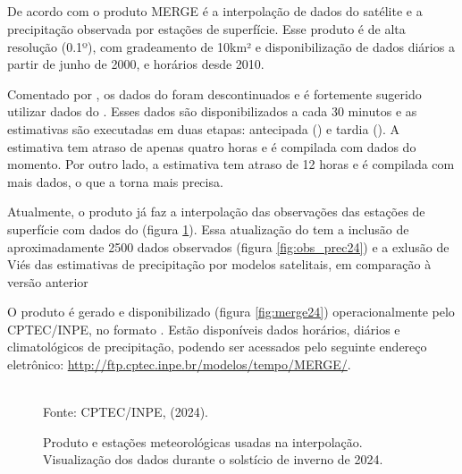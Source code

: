 \subsection{}

\indent De acordo com  o produto \acrshort{MERGE} é a interpolação de dados do satélite  e a precipitação observada por estações de superfície. Esse produto é de alta resolução (0.1º), com gradeamento de 10km² e disponibilização de dados diários a partir de junho de 2000, e horários desde 2010.

\indent Comentado por , os dados do  foram descontinuados e é fortemente sugerido utilizar dados do . Esses dados são disponibilizados a cada 30 minutos e as estimativas são executadas em duas etapas: antecipada () e tardia (). A estimativa  tem atraso de apenas quatro horas e é compilada com dados do momento. Por outro lado, a estimativa  tem atraso de 12 horas e é compilada com mais dados, o que a torna mais precisa.

\indent Atualmente, o produto  já faz a interpolação das observações das estações de superfície com dados do  (figura \ref{fig:merge_obs24}). Essa atualização do  tem a inclusão de aproximadamente 2500 dados observados (figura \ref{fig:obs_prec24}) e a exlusão de Viés das estimativas de precipitação por modelos satelitais, em comparação à versão anterior \cite{MERGEatual}

\indent O produto é gerado e disponibilizado (figura \ref{fig:merge24}) operacionalmente pelo \acrshort{CPTEC}/\acrshort{INPE}, no formato . Estão disponíveis dados horários, diários e climatológicos de precipitação, podendo ser acessados pelo seguinte endereço eletrônico: \url{http://ftp.cptec.inpe.br/modelos/tempo/MERGE/}.

\begin{figure}[htbp]
    \centering
    \caption{Produto  e estações meteorológicas usadas na interpolação. Visualização dos dados durante o solstício de inverno de 2024.} %
    \label{fig:merge_obs24}
    \hfill
    \\
    \small{Fonte: \acrshort{CPTEC}/\acrshort{INPE}, \citeauthor{MERGEatual} (2024).}
\end{figure}


